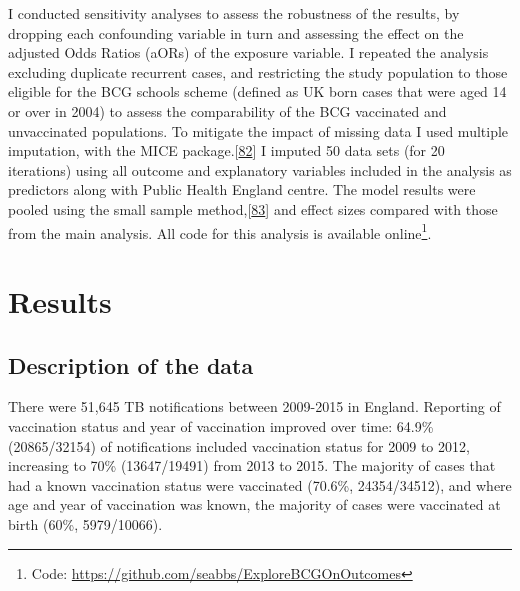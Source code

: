 \documentclass[11pt,twoside]{bristolthesis}
\begin{document}
  I conducted sensitivity analyses to assess the robustness of the results, by dropping each confounding variable in turn and assessing the effect on the adjusted Odds Ratios (aORs) of the exposure variable. I repeated the analysis excluding duplicate recurrent cases, and restricting the study population to those eligible for the BCG schools scheme (defined as UK born cases that were aged 14 or over in 2004) to assess the comparability of the BCG vaccinated and unvaccinated populations. To mitigate the impact of missing data I used multiple imputation, with the MICE package.{[}\protect\hyperlink{ref-VanBuuren2011}{82}{]} I imputed 50 data sets (for 20 iterations) using all outcome and explanatory variables included in the analysis as predictors along with Public Health England centre. The model results were pooled using the small sample method,{[}\protect\hyperlink{ref-Barnard1999}{83}{]} and effect sizes compared with those from the main analysis. All code for this analysis is available online\footnote{Code: \url{https://github.com/seabbs/ExploreBCGOnOutcomes}}.
  
  \hypertarget{results-1}{%
  \section{Results}\label{results-1}}
  
  \hypertarget{description-of-the-data}{%
  \subsection{Description of the data}\label{description-of-the-data}}
  
  There were 51,645 TB notifications between 2009-2015 in England. Reporting of vaccination status and year of vaccination improved over time: 64.9\% (20865/32154) of notifications included vaccination status for 2009 to 2012, increasing to 70\% (13647/19491) from 2013 to 2015. The majority of cases that had a known vaccination status were vaccinated (70.6\%, 24354/34512), and where age and year of vaccination was known, the majority of cases were vaccinated at birth (60\%, 5979/10066).
  
\end{document}

